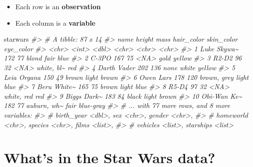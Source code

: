 \documentclass[
]{book}
\newenvironment{Shaded}{\begin{snugshade}}{\end{snugshade}}
\newcommand{\CommentTok}[1]{\textcolor[rgb]{0.56,0.35,0.01}{\textit{#1}}}
\newcommand{\NormalTok}[1]{#1}
\providecommand{\tightlist}{%
  \setlength{\itemsep}{0pt}\setlength{\parskip}{0pt}}
\theoremstyle{definition}
\theoremstyle{definition}
\theoremstyle{definition}
\theoremstyle{definition}
\theoremstyle{remark}
\begin{document}
\begin{itemize}
\tightlist
\item
  Each row is an \textbf{observation}
\item
  Each column is a \textbf{variable}
\end{itemize}

\begin{Shaded}
\begin{Highlighting}[]
\NormalTok{starwars}
\CommentTok{\#\textgreater{} \# A tibble: 87 x 14}
\CommentTok{\#\textgreater{}    name        height  mass hair\_color  skin\_color eye\_color}
\CommentTok{\#\textgreater{}    \textless{}chr\textgreater{}        \textless{}int\textgreater{} \textless{}dbl\textgreater{} \textless{}chr\textgreater{}       \textless{}chr\textgreater{}      \textless{}chr\textgreater{}    }
\CommentTok{\#\textgreater{}  1 Luke Skywa\textasciitilde{}    172    77 blond       fair       blue     }
\CommentTok{\#\textgreater{}  2 C{-}3PO          167    75 \textless{}NA\textgreater{}        gold       yellow   }
\CommentTok{\#\textgreater{}  3 R2{-}D2           96    32 \textless{}NA\textgreater{}        white, bl\textasciitilde{} red      }
\CommentTok{\#\textgreater{}  4 Darth Vader    202   136 none        white      yellow   }
\CommentTok{\#\textgreater{}  5 Leia Organa    150    49 brown       light      brown    }
\CommentTok{\#\textgreater{}  6 Owen Lars      178   120 brown, grey light      blue     }
\CommentTok{\#\textgreater{}  7 Beru White\textasciitilde{}    165    75 brown       light      blue     }
\CommentTok{\#\textgreater{}  8 R5{-}D4           97    32 \textless{}NA\textgreater{}        white, red red      }
\CommentTok{\#\textgreater{}  9 Biggs Dark\textasciitilde{}    183    84 black       light      brown    }
\CommentTok{\#\textgreater{} 10 Obi{-}Wan Ke\textasciitilde{}    182    77 auburn, wh\textasciitilde{} fair       blue{-}gray}
\CommentTok{\#\textgreater{} \# ... with 77 more rows, and 8 more variables:}
\CommentTok{\#\textgreater{} \#   birth\_year \textless{}dbl\textgreater{}, sex \textless{}chr\textgreater{}, gender \textless{}chr\textgreater{},}
\CommentTok{\#\textgreater{} \#   homeworld \textless{}chr\textgreater{}, species \textless{}chr\textgreater{}, films \textless{}list\textgreater{},}
\CommentTok{\#\textgreater{} \#   vehicles \textless{}list\textgreater{}, starships \textless{}list\textgreater{}}
\end{Highlighting}
\end{Shaded}

\hypertarget{whats-in-the-star-wars-data-1}{%
\section{What's in the Star Wars data?}\label{whats-in-the-star-wars-data-1}}
\end{document}
